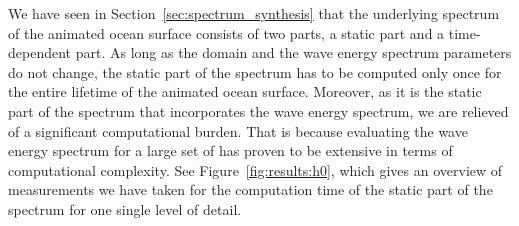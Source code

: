 %
We have seen in Section~\ref{sec:spectrum_synthesis} that the underlying
spectrum of the animated ocean surface consists of two parts, a static part
and a time-dependent part.
As long as the \wavevector domain and the wave energy spectrum parameters do
not change, the static part of the spectrum has to be computed only once for
the entire lifetime of the animated ocean surface.
Moreover, as it is the static part of the spectrum that incorporates the wave
energy spectrum, we are relieved of a significant computational burden.
That is because evaluating the wave energy spectrum for a large set of
\wavevectors has proven to be extensive in terms of computational complexity.
See Figure~\ref{fig:results:h0}, which gives an overview of measurements we
have taken for the computation time of the static part of the spectrum for one
single level of detail.
%
